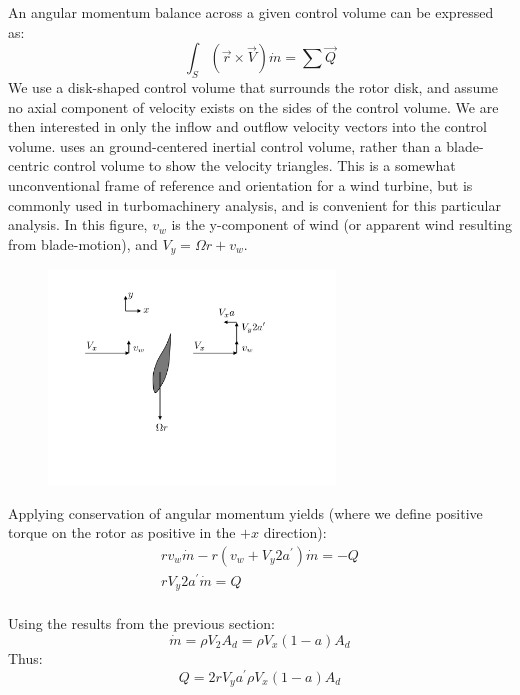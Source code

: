 \documentclass{article}
\begin{document}
An angular momentum balance across a given control volume can be expressed as:
\begin{equation}
    \int_S \left(\vec{r} \times \vec{V}\right) \dot{m} = \sum \vec{Q}
\end{equation}
We use a disk-shaped control volume that surrounds the rotor disk, and assume no axial component of velocity exists on the sides of the control volume.  We are then interested in only the inflow and outflow velocity vectors into the control volume.  uses an ground-centered inertial control volume, rather than a blade-centric control volume to show the velocity triangles.  This is a somewhat unconventional frame of reference and orientation for a wind turbine, but is commonly used in turbomachinery analysis, and is convenient for this particular analysis.  In this figure, $v_w$ is the y-component of wind (or apparent wind resulting from blade-motion), and $V_y = \Omega r + v_w$.
\begin{figure}[htbp]
\centering
\includegraphics[width=3.0in]{figures/wtvt}
\caption{}
\label{fig:wtvt}
\end{figure}


Applying conservation of angular momentum yields (where we define positive torque on the rotor as positive in the $+x$ direction):
\begin{equation}
    \begin{aligned}
        r v_w \dot{m} - r (v_w + V_y 2 a^\prime) \dot{m} = -Q\\
         r V_y 2 a^\prime \dot{m} = Q\\
    \end{aligned}
    \label{eq:momQ}
\end{equation}

Using the results from the previous section:
\begin{equation}
    \dot{m} = \rho V_2 A_d = \rho V_x(1-a) A_d
    \label{eq:mdot}
\end{equation}
Thus:
\begin{equation}
    Q = 2 r V_y a^\prime \rho V_x(1-a) A_d
\end{equation}
\end{document}
